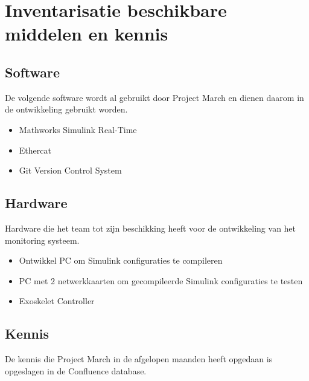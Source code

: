 \section{Inventarisatie beschikbare middelen en kennis}
\subsection{Software}
De volgende software wordt al gebruikt door Project March en dienen daarom in de ontwikkeling gebruikt worden.
\begin{itemize}
	\item Mathworks Simulink Real-Time
	\item Ethercat 
	\item Git Version Control System
\end{itemize}

\subsection{Hardware}
Hardware die het team tot zijn beschikking heeft voor de ontwikkeling van het monitoring systeem.
\begin{itemize}
	\item Ontwikkel PC om Simulink configuraties te compileren
	\item PC met 2 netwerkkaarten om gecompileerde Simulink configuraties te testen
	\item Exoskelet Controller
\end{itemize}

\subsection{Kennis}
De kennis die Project March in de afgelopen maanden heeft opgedaan is opgeslagen in de Confluence database.